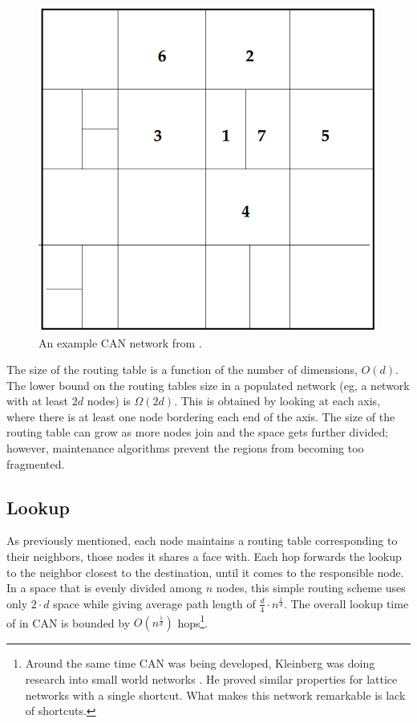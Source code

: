 \begin{figure}
	\centering
	\includegraphics[width=0.7\linewidth]{figs/can}
	\caption{An example CAN network from \cite{can}.}
	\label{fig:can}
\end{figure}


The size of the routing table is a function of the number of dimensions, $O(d)$. 
The lower bound on the routing tables size in a populated network (eg, a network with at least $2d$ nodes) is $\Omega(2d)$.  
This is obtained by looking at each axis, where there is at least one node bordering each end of the axis.
The size of the routing table can grow as more nodes join and the space gets further divided; however, maintenance algorithms prevent the regions from becoming too fragmented.


\subsection*{Lookup}
As previously mentioned, each node maintains a routing table corresponding to their neighbors, those nodes it shares a face with.
Each hop forwards the lookup to the neighbor closest to the destination, until it comes to the responsible node.
In a space that is evenly divided among $n$ nodes, this simple routing scheme uses only $2 \cdot d$ space while giving average path length of $\frac{d}{4}\cdot n^{\frac{1}{d}}$.
The overall lookup time of in CAN is bounded by $O(n^{\frac{1}{d}})$ hops\footnote{Around the same time CAN was being developed, Kleinberg was doing research into small world networks \cite{kleinberg2000small}.  
He proved similar properties for lattice networks with a single shortcut.  What makes this network remarkable is lack of shortcuts.}.

